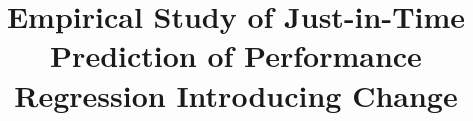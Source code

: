 \documentclass[conference]{IEEEtran}
\begin{document}
\pagestyle{plain}	
%
\title{Empirical Study of Just-in-Time Prediction of Performance Regression Introducing Change}


\maketitle
\end{document}
